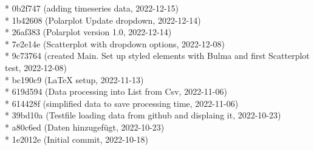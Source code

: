 \documentclass[usegeometry=true]{scrartcl}
\begin{document}
* 0b2f747 (adding timeseries data, 2022-12-15)\\
* 1b42608 (Polarplot Update dropdown, 2022-12-14)\\
* 26af383 (Polarplot version 1.0, 2022-12-14)\\
* 7e2e14e (Scatterplot with dropdown options, 2022-12-08)\\
* 9c73764 (created Main. Set up styled elements with Bulma and first Scatterplot test, 2022-12-08)\\
* bc190c9 (LaTeX setup, 2022-11-13)\\
* 619d594 (Data processing into List from Csv, 2022-11-06)\\
* 614428f (simplified data to save processing time, 2022-11-06)\\
* 39bd10a (Testfile loading data from github and displaing it, 2022-10-23)\\
* a80c6ed (Daten hinzugefügt, 2022-10-23)\\
* 1e2012e (Initial commit, 2022-10-18)\\
\end{document}
